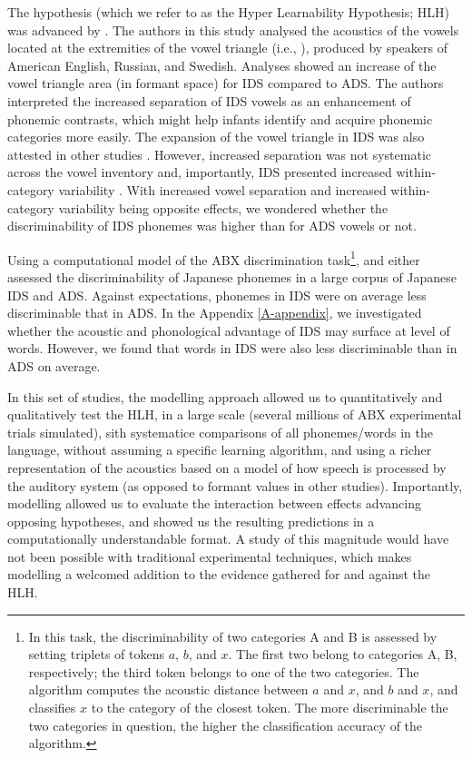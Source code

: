 The hypothesis (which we refer to as the Hyper Learnability Hypothesis; HLH) was advanced by \cite{kuhl1997}. The authors in this study analysed the acoustics of the vowels located at the extremities of the vowel triangle (i.e., ), produced by speakers of American English, Russian, and Swedish. Analyses showed an increase of the vowel triangle area (in formant space) for IDS compared to ADS. The authors interpreted the increased separation of IDS vowels as an enhancement of phonemic contrasts, which might help infants identify and acquire phonemic categories more easily. The expansion of the vowel triangle in IDS was also attested in other studies \cite{andruski1999, bernstein1984, burnham2002, cristia2014, liu2003, mcmurray2013, uther2007}. However, increased separation was not systematic across the vowel inventory \cite{cristia2014} and, importantly, IDS presented increased within-category variability \cite{mcmurray2013, cristia2014, kirchoff2005}. With increased vowel separation and increased within-category variability being opposite effects, we wondered whether the discriminability of IDS phonemes was higher than for ADS vowels or not.

Using a computational model of the ABX discrimination task\footnote{In this task, the discriminability of two categories \textsc{A} and \textsc{B} is assessed by setting triplets of tokens $a$, $b$, and $x$. The first two belong to categories \textsc{A}, \textsc{B}, respectively; the third token belongs to one of the two categories. The algorithm computes the acoustic distance between $a$ and $x$, and $b$ and $x$, and classifies $x$ to the category of the closest token. The more discriminable the two categories in question, the higher the classification accuracy of the algorithm.}, and either \cite{martin2015} assessed the discriminability of Japanese phonemes in a large corpus of Japanese IDS and ADS. Against expectations, phonemes in IDS were on average less discriminable that in ADS. In the Appendix \ref{A-appendix}, we investigated whether the acoustic and phonological advantage of IDS may surface at level of words. However, we found that words in IDS were also less discriminable than in ADS on average. 

In this set of studies, the modelling approach allowed us to quantitatively and qualitatively test the HLH, in a large scale (several millions of ABX experimental trials simulated), sith systematice comparisons of all phonemes/words in the language, without assuming a specific learning algorithm, and using a richer representation of the acoustics based on a model of how speech is processed by the auditory system (as opposed to formant values in other studies). Importantly, modelling allowed us to evaluate the interaction between effects advancing opposing hypotheses, and showed us the resulting predictions in a computationally understandable format. A study of this magnitude would have not been possible with traditional experimental techniques, which makes modelling a welcomed addition to the evidence gathered for and against the HLH.  

